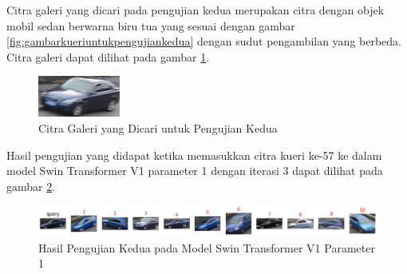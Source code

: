 Citra galeri yang dicari pada pengujian kedua merupakan citra dengan objek \linebreak mobil sedan berwarna biru tua 
yang sesuai dengan gambar \ref{fig:gambarkueriuntukpengujiankedua} dengan sudut pengambilan yang berbeda. Citra galeri 
dapat dilihat pada gambar \ref{fig:gambargaleriuntukpengujiankedua}.


\begin{figure}[h!]
  \centering
  \includegraphics[scale=1.4]{gambar/Gal57_1112.jpg}
  \caption{Citra Galeri yang Dicari untuk Pengujian Kedua}
  \label{fig:gambargaleriuntukpengujiankedua}
\end{figure}

Hasil pengujian yang didapat ketika memasukkan citra kueri ke-57 ke dalam model Swin Transformer V1 parameter 1 dengan 
iterasi 3 dapat dilihat pada gambar \ref{fig:hasilpengujiankeduapadamodelswintransformerv1param1}.

\begin{figure}[h!]
  \centering
  \includegraphics[scale=0.6]{gambar/qUE57v1P1IT3.png}
  \caption{Hasil Pengujian Kedua pada Model Swin Transformer V1 Parameter 1}
  \label{fig:hasilpengujiankeduapadamodelswintransformerv1param1}
\end{figure}

